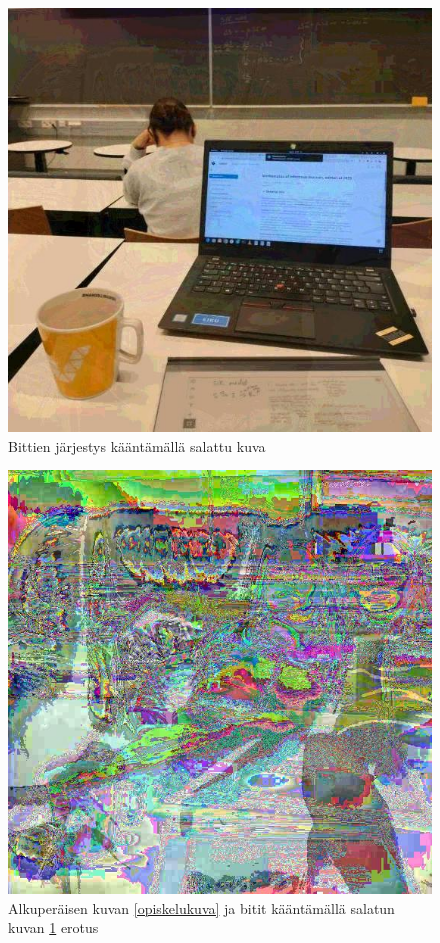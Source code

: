 \documentclass[a4paper,11pt]{article}
\begin{document}
\begin{figure}
    \centering
    \includegraphics[width= 120mm]{kuvat/salattu3.jpg}
    \caption{Bittien järjestys kääntämällä salattu kuva}
    \label{salattu-reverse}
\end{figure}

\begin{figure}
    \centering
    \includegraphics[width= 120mm]{kuvat/erotus3.jpg}
    \caption{Alkuperäisen kuvan \ref{opiskelukuva} ja bitit kääntämällä salatun kuvan \ref{salattu-reverse} erotus}
    \label{erotus-reverse}
\end{figure}
\end{document}
